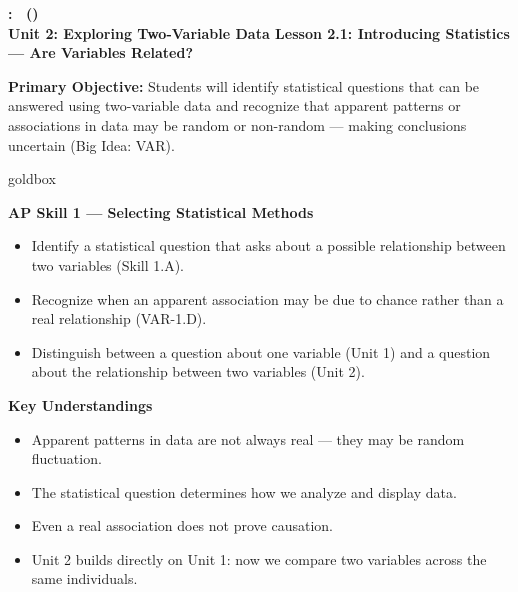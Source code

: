 \documentclass[10pt]{article}
\newcommand{\UnitNumberName}{Unit 2: Exploring Two-Variable Data \quad}
\newcommand{\LessonNumberName}{Lesson 2.1: Introducing Statistics --- Are Variables Related?}
\begin{document}
\begin{center}
    {\Large\bfseries \CourseName: \SchoolYear\ (\MeetingLength) \\
    {\small\bfseries \UnitNumberName \LessonNumberName}}
\end{center}

\begin{tcolorbox}[colback=sky, colframe=navy, boxrule=0.9pt, arc=2mm,
    left=2mm, right=2mm, top=1.5mm, bottom=1.5mm]
    \textbf{Primary Objective:} Students will identify statistical questions that can be
    answered using two-variable data and recognize that apparent patterns or associations
    in data may be random or non-random --- making conclusions uncertain (Big Idea: VAR).
\end{tcolorbox}

\renewcommand{\arraystretch}{1.6}
\begin{skillbox}{goldbox}
\begin{minipage}[t]{0.48\linewidth}
    \textbf{AP Skill 1 --- Selecting Statistical Methods}
    \begin{itemize}
        \item Identify a statistical question that asks about a possible relationship between two variables (Skill 1.A).
        \item Recognize when an apparent association may be due to chance rather than a real relationship (VAR-1.D).
        \item Distinguish between a question about one variable (Unit 1) and a question about the relationship between two variables (Unit 2).
    \end{itemize}
\end{minipage}
\hfill
\begin{minipage}[t]{0.48\linewidth}
    \textbf{Key Understandings}
    \begin{itemize}
        \item Apparent patterns in data are not always real --- they may be random fluctuation.
        \item The statistical question determines how we analyze and display data.
        \item Even a real association does not prove causation.
        \item Unit 2 builds directly on Unit 1: now we compare two variables across the same individuals.
    \end{itemize}
\end{minipage}
\end{skillbox}
\end{document}
